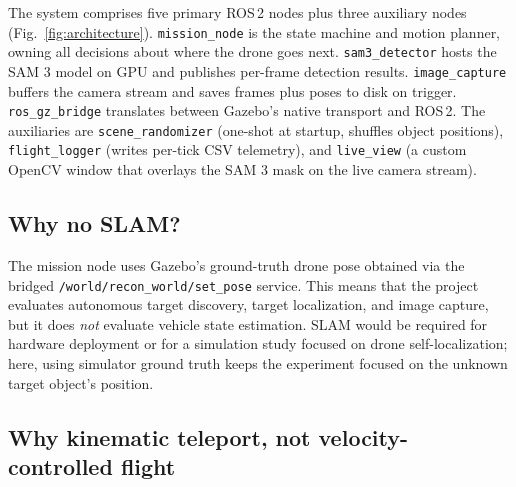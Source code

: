 \documentclass[conference]{IEEEtran}
\begin{document}
The system comprises five primary ROS\,2 nodes plus three auxiliary
nodes (Fig.~\ref{fig:architecture}). \texttt{mission\_node} is the
state machine and motion planner, owning all decisions about where
the drone goes next. \texttt{sam3\_detector} hosts the SAM 3 model on
GPU and publishes per-frame detection results. \texttt{image\_capture}
buffers the camera stream and saves frames plus poses to disk on
trigger. \texttt{ros\_gz\_bridge} translates between Gazebo's native
transport and ROS\,2. The auxiliaries are \texttt{scene\_randomizer}
(one-shot at startup, shuffles object positions),
\texttt{flight\_logger} (writes per-tick CSV telemetry), and
\texttt{live\_view} (a custom OpenCV window that overlays the SAM 3
mask on the live camera stream).

\subsection{Why no SLAM?}

The mission node uses Gazebo's ground-truth drone pose obtained via
the bridged \texttt{/world/recon\_world/set\_pose} service. This means
that the project evaluates autonomous target discovery, target
localization, and image capture, but it does \emph{not} evaluate
vehicle state estimation. SLAM would be required for hardware
deployment or for a simulation study focused on drone self-localization;
here, using simulator ground truth keeps the experiment focused on the
unknown target object's position.

\subsection{Why kinematic teleport, not velocity-controlled flight}
\end{document}
